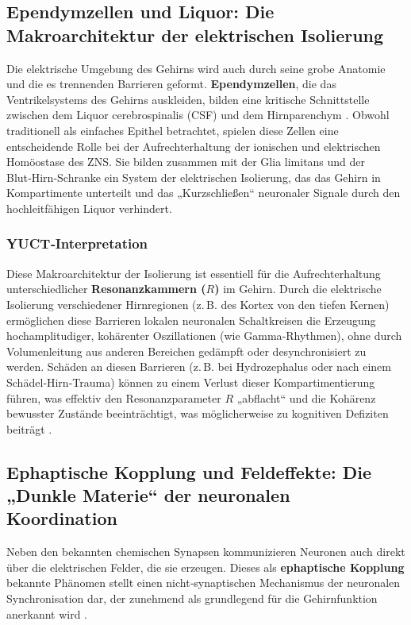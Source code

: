 \documentclass[12pt,a4paper]{article}
\begin{document}
	\subsection{Ependymzellen und Liquor: Die Makroarchitektur der elektrischen Isolierung}
	
	Die elektrische Umgebung des Gehirns wird auch durch seine grobe Anatomie und die es trennenden Barrieren geformt. \textbf{Ependymzellen}, die das Ventrikelsystems des Gehirns auskleiden, bilden eine kritische Schnittstelle zwischen dem Liquor cerebrospinalis (CSF) und dem Hirnparenchym \cite{DelBigio2010}. Obwohl traditionell als einfaches Epithel betrachtet, spielen diese Zellen eine entscheidende Rolle bei der Aufrechterhaltung der ionischen und elektrischen Homöostase des ZNS. Sie bilden zusammen mit der Glia limitans und der Blut‑Hirn‑Schranke ein System der elektrischen Isolierung, das das Gehirn in Kompartimente unterteilt und das „Kurzschließen“ neuronaler Signale durch den hochleitfähigen Liquor verhindert.
	
	\subsubsection*{YUCT‑Interpretation}
	Diese Makroarchitektur der Isolierung ist essentiell für die Aufrechterhaltung unterschiedlicher \textbf{Resonanzkammern (\(R\))} im Gehirn. Durch die elektrische Isolierung verschiedener Hirnregionen (z. B. des Kortex von den tiefen Kernen) ermöglichen diese Barrieren lokalen neuronalen Schaltkreisen die Erzeugung hochamplitudiger, kohärenter Oszillationen (wie Gamma‑Rhythmen), ohne durch Volumenleitung aus anderen Bereichen gedämpft oder desynchronisiert zu werden. Schäden an diesen Barrieren (z. B. bei Hydrozephalus oder nach einem Schädel‑Hirn‑Trauma) können zu einem Verlust dieser Kompartimentierung führen, was effektiv den Resonanzparameter \(R\) „abflacht“ und die Kohärenz bewusster Zustände beeinträchtigt, was möglicherweise zu kognitiven Defiziten beiträgt \cite{Krishnamurthy2012}.
	
	\subsection{Ephaptische Kopplung und Feldeffekte: Die „Dunkle Materie“ der neuronalen Koordination}
	
	Neben den bekannten chemischen Synapsen kommunizieren Neuronen auch direkt über die elektrischen Felder, die sie erzeugen. Dieses als \textbf{ephaptische Kopplung} bekannte Phänomen stellt einen nicht‑synaptischen Mechanismus der neuronalen Synchronisation dar, der zunehmend als grundlegend für die Gehirnfunktion anerkannt wird \cite{Jefferys1995, Anastassiou2011}.
	
\end{document}
